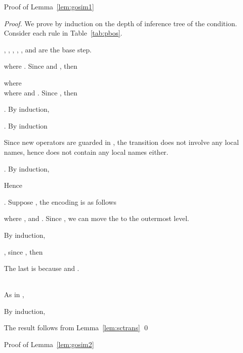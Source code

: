 \documentclass[runningheads, envcountsame, a4paper]{llncs}
\begin{document}
Proof of Lemma~\ref{lem:gosim1}

\begin{proof}
  We prove by induction on the depth of inference tree of the condition. Consider each rule in Table~\ref{tab:pbos}.

  , , , , ,  and  are the base step.

  

  

  
  

  
  

  
  where .
  Since  and , then 
  

  
  

    where  \\

  where  and .
  Since , then 
  

   . By induction,
  
  

   . By induction
  
  Since new operators are guarded in , the transition does not involve any local names, hence  does not contain any local names either.
  

   . By induction,
  
  
  Hence
  

   . Suppose , the encoding is as follows
  
  where ,  and . Since , we can move the  to the outermost level.
  
  By induction,
  
  , since , then
  
  The last  is because  and .

    \\
  As in ,
  
  By induction,
  
  

   The result follows from Lemma~\ref{lem:sctrans} \qed
\end{proof}

Proof of Lemma~\ref{lem:gosim2}
\end{document}
